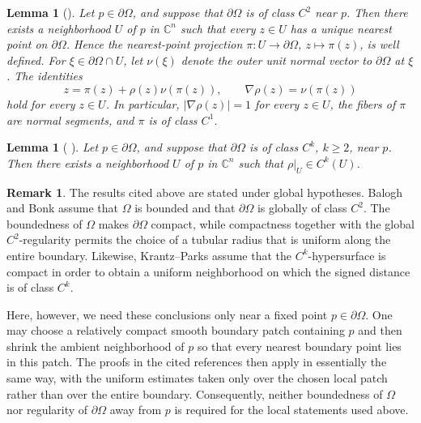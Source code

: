 \documentclass[11pt]{article}
\newtheorem{lemma}[theorem]{Lemma}
\theoremstyle{definition}
\newtheorem{remark}[theorem]{Remark}
\newcommand{\C}{\mathbb{C}}
\begin{document}
\begin{lemma}[{\cite[Lemma~2.1]{BaloghBonk}}]
\label{lem:signed-distance-tubular}
Let \(p\in\partial\Omega\), and suppose that \(\partial\Omega\) is of class \(C^2\) near \(p\). Then there exists a neighborhood \(U\) of \(p\) in \(\C^n\) such that every \(z\in U\) has a unique nearest point on \(\partial\Omega\). Hence the nearest-point projection \(\pi:U\to\partial\Omega\), \(z\mapsto\pi(z)\), is well defined. For \(\xi\in\partial\Omega\cap U\), let \(\nu(\xi)\) denote the outer unit normal vector to \(\partial\Omega\) at \(\xi\). The identities
\begin{equation*}
z=\pi(z)+\rho(z)\nu(\pi(z)),\qquad \nabla\rho(z)=\nu(\pi(z))
\end{equation*}
hold for every \(z\in U\).
In particular, \(|\nabla\rho(z)|=1\) for every \(z\in U\), the fibers of \(\pi\) are normal segments, and \(\pi\) is of class \(C^1\).
\end{lemma}
\begin{lemma}[
{\cite[Theorem~3, p.~119]{KrantzParks}}]
\label{lem:signed-distance-smooth}
Let \(p\in\partial\Omega\), and suppose that \(\partial\Omega\) is of
class \(C^k\), \(k\ge2\), near \(p\). Then there exists a neighborhood \(U\) of \(p\) in \(\C^n\) such that
\(\rho|_U\in C^k(U)\).
\end{lemma}
\begin{remark}
The results cited above are stated under global hypotheses. Balogh and
Bonk assume that \(\Omega\) is bounded and that \(\partial\Omega\) is
globally of class \(C^2\). The boundedness of \(\Omega\) makes
\(\partial\Omega\) compact, while compactness together with the global
\(C^2\)-regularity permits the choice of a tubular radius that is uniform
along the entire boundary. Likewise, Krantz--Parks assume that the
\(C^k\)-hypersurface is compact in order to obtain a uniform neighborhood
on which the signed distance is of class \(C^k\).

Here, however, we need these conclusions only near a fixed point
\(p\in\partial\Omega\).  One may choose a relatively compact smooth
boundary patch containing \(p\) and then shrink the ambient
neighborhood of \(p\) so that every nearest boundary point lies in this
patch.  The proofs in the cited references then apply in essentially
the same way, with the uniform estimates taken only over the chosen
local patch rather than over the entire boundary.  Consequently,
neither boundedness of \(\Omega\) nor regularity of \(\partial\Omega\)
away from \(p\) is required for the local statements used above.
\end{remark}
\end{document}
